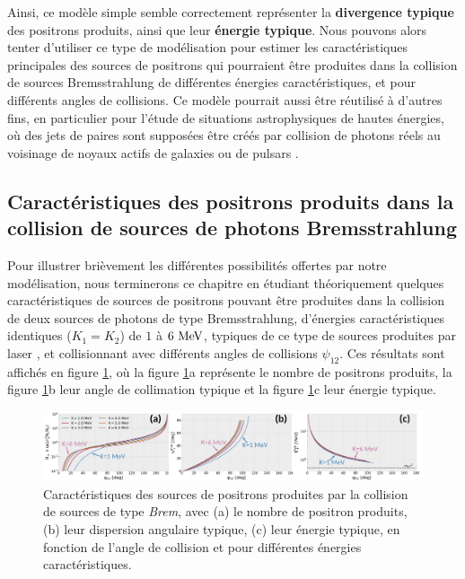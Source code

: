 \begin{refsection}
Ainsi, ce modèle simple semble correctement représenter la \textbf{divergence typique} des positrons produits, ainsi que leur \textbf{énergie typique}. Nous pouvons alors tenter d'utiliser ce type de modélisation pour estimer les caractéristiques principales des sources de positrons qui pourraient être produites dans la collision de sources Bremsstrahlung de différentes énergies caractéristiques, et pour différents angles de collisions. Ce modèle pourrait aussi être réutilisé à d'autres fins, en particulier pour l'étude de situations astrophysiques de hautes énergies, où des jets de paires sont supposées être créés par collision de photons réels au voisinage de noyaux actifs de galaxies \parencite{ruffini_2010,bonometto_1971} ou de pulsars \parencite{zhang_1998}.

\subsection{Caractéristiques des positrons produits dans la collision de sources de photons Bremsstrahlung}

Pour illustrer brièvement les différentes possibilités offertes par notre modélisation, nous terminerons ce chapitre en étudiant théoriquement quelques caractéristiques de sources de positrons pouvant être produites dans la collision de deux sources de photons de type Bremsstrahlung, d'énergies caractéristiques identiques ($K_1=K_2$) de $1$ à $6 ~ \rm MeV$, typiques de ce type de sources produites par laser \parencite{norreys_1999, henderson_2014, palaniyappan_2019}, et collisionnant avec différents angles de collisions $\psi_{12}$. Ces résultats sont affichés en figure \ref{fig:54-positrons_Brem}, où la figure \ref{fig:54-positrons_Brem}a représente le nombre de positrons produits, la figure \ref{fig:54-positrons_Brem}b leur angle de collimation typique et la figure \ref{fig:54-positrons_Brem}c leur énergie typique.

\begin{figure}[hbtp]
	\centering
	\includegraphics[width=\linewidth]{5-opti_theorique/cinematique_Brem.png}
	\caption{Caractéristiques des sources de positrons produites par la collision de sources de type \textit{Brem}, avec (a) le nombre de positron produits, (b) leur dispersion angulaire typique, (c) leur énergie typique, en fonction de l'angle de collision et pour différentes énergies caractéristiques.}
	\label{fig:54-positrons_Brem}
\end{figure}


\end{refsection}
